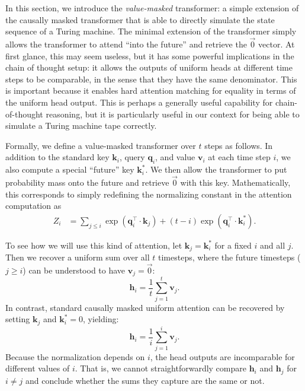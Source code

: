 In this section, we introduce the \emph{value-masked} transformer: a simple extension of the causally masked transformer that is able to directly simulate the state sequence of a Turing machine. The minimal extension of the transformer simply allows the transformer to attend ``into the future'' and retrieve the $\vec 0$ vector. At first glance, this may seem useless, but it has some powerful implications in the chain of thought setup: it allows the outputs of uniform heads at different time steps to be comparable, in the sense that they have the same denominator. This is important because it enables hard attention matching for equality in terms of the uniform head output.
This is perhaps a generally useful capability for chain-of-thought reasoning, but it is particularly useful in our context for being able to simulate a Turing machine tape correctly.

Formally, we define a value-masked transformer over $t$ steps as follows. In addition to the standard key $\mathbf k_i$, query $\mathbf q_i$, and value $\mathbf v_i$ at each time step $i$, we also compute a special ``future'' key $\mathbf k_i^*$. We then allow the transformer to put probability mass onto the future and retrieve $\vec 0$ with this key. Mathematically, this corresponds to simply redefining the normalizing constant in the attention computation as
\begin{align*}
    Z_i &= \sum_{j \leq i} \exp(\mathbf q_i^\top \cdot \mathbf k_j) + (t - i) \exp(\mathbf q_i^\top \cdot \mathbf k_i^*) .
\end{align*}

To see how we will use this kind of attention, let $\mathbf k_j = \mathbf k_i^*$ for a fixed $i$ and all $j$. Then we recover a uniform sum over all $t$ timesteps, where the future timesteps ($j \geq i$) can be understood to have $\mathbf v_j = \vec 0$:
\begin{equation*}
    \mathbf h_i = \frac{1}{t} \sum_{j=1}^{t} \mathbf v_j .
\end{equation*}
In contrast, standard causally masked uniform attention can be recovered by setting $\mathbf k_j$ and $\mathbf k_i^* = 0$, yielding:
\begin{equation*}
    \mathbf h_i = \frac{1}{i} \sum_{j=1}^i \mathbf v_j .
\end{equation*}
Because the normalization depends on $i$, the head outputs are incomparable for different values of $i$. That is, we cannot straightforwardly compare $\mathbf h_i$ and $\mathbf h_j$ for $i \neq j$ and conclude whether the sums they capture are the same or not.

